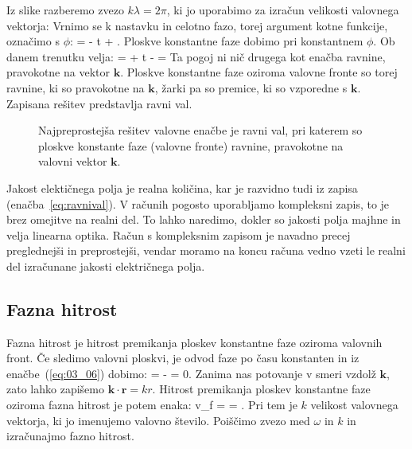 Iz slike razberemo
zvezo $k\lambda = 2\pi$, ki jo uporabimo za izračun velikosti valovnega
vektorja:
Vrnimo se k nastavku in celotno fazo, torej argument kotne funkcije, označimo s $\phi$:
\beq
\phi = \cdot {} - \omega t + \delta.
\label{eq:03_06}
\eeq
Ploskve konstantne faze dobimo pri konstantnem $\phi$. Ob danem trenutku velja:
\beq
{}\cdot {} = \phi + \omega t - \delta = 
\label{eq:03_08}
\eeq
Ta pogoj ni nič drugega kot enačba ravnine, pravokotne na vektor $\mathbf{k}$. Ploskve konstantne faze
oziroma valovne fronte so torej ravnine, ki so pravokotne na $\mathbf{k}$, žarki pa so premice, ki 
so vzporedne s $\mathbf{k}$. Zapisana rešitev predstavlja ravni val.
\begin{figure}[ht]
\centering
\def\svgwidth{90truemm} 

\caption{Najpreprostejša rešitev valovne enačbe je ravni val, pri katerem so ploskve konstante
faze (valovne fronte) ravnine, pravokotne na valovni vektor $\mathbf{k}$.}
\label{fig:03_ravnival}
\end{figure}
\begin{remark}
Jakost elektičnega polja je realna količina, kar je razvidno tudi iz zapisa (enačba~\ref{eq:ravnival}). 
V računih pogosto uporabljamo kompleksni zapis, to je brez omejitve na realni del. To lahko 
naredimo, dokler so jakosti polja majhne in velja linearna optika. Račun s kompleksnim zapisom
je navadno precej preglednejši in preprostejši, vendar moramo na koncu računa vedno vzeti le
realni del izračunane jakosti električnega polja. 
\end{remark}

\subsection*{Fazna hitrost}
Fazna hitrost je hitrost premikanja ploskev konstantne faze oziroma valovnih front. 
Če sledimo valovni ploskvi, je odvod faze po času konstanten in iz enačbe~(\ref{eq:03_06}) 
dobimo:
\beq
{}= \cdot {} - \omega = 0.
\label{eq:03_09}
\eeq
Zanima nas potovanje v smeri vzdolž $\mathbf{k}$, 
zato lahko zapišemo $\mathbf{k}\cdot \mathbf{r} = kr$. Hitrost premikanja ploskev
konstantne faze oziroma fazna hitrost je potem enaka:
\beq
v_f =  = .
\label{eq:03_10}
\eeq
Pri tem je $k$ velikost valovnega vektorja, ki jo imenujemo valovno število.
Poiščimo zvezo med $\omega$ in $k$ in izračunajmo fazno hitrost.

